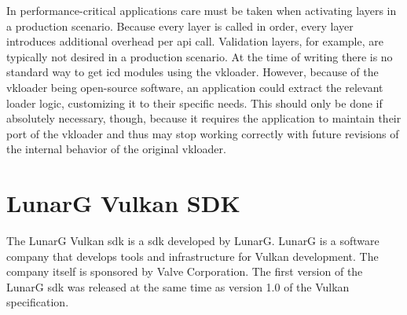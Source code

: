    In performance-critical applications care must be taken when activating layers in a production scenario. Because every layer is called in order, every layer introduces additional overhead per \gls{api} call. Validation layers, for example, are typically not desired in a production scenario. At the time of writing there is no standard way to get \gls{icd} modules using the \gls{vkloader}. However, because of the \gls{vkloader} being open-source software, an application could extract the relevant loader logic, customizing it to their specific needs. This should only be done if absolutely necessary, though, because it requires the application to maintain their port of the \gls{vkloader} and thus may stop working correctly with future revisions of the internal behavior of the original \gls{vkloader}.










  \section{LunarG Vulkan SDK}
  \label{sec:LunarGSDK}
    The LunarG Vulkan \gls{sdk}\cite{lunargvulkansdk} is a \acrlong{sdk} developed by LunarG. LunarG is a software company that develops tools and infrastructure for Vulkan development. The company itself is sponsored by Valve Corporation. The first version of the LunarG \gls{sdk} was released at the same time as version 1.0 of the Vulkan specification.

